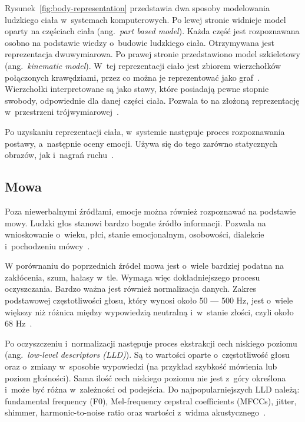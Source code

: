 Rysunek~\ref{fig:body-representation} przedstawia dwa sposoby modelowania ludzkiego ciała w~systemach komputerowych.
Po lewej stronie widnieje model oparty na częściach ciała (ang.~\textit{part based model}).
Każda część jest rozpoznawana osobno na podstawie wiedzy o~budowie ludzkiego ciała.
Otrzymywana jest reprezentacja dwuwymiarowa.
Po prawej stronie przedstawiono model szkieletowy (ang.~\textit{kinematic model}).
W~tej reprezentacji ciało jest zbiorem wierzchołków połączonych krawędziami, przez co można je reprezentować jako graf~\cite{Noroozi2021}.
Wierzchołki interpretowane są jako stawy, które posiadają pewne stopnie swobody, odpowiednie dla danej części ciała.
Pozwala to na złożoną reprezentację w~przestrzeni trójwymiarowej~\cite{Calvo2015}.

Po uzyskaniu reprezentacji ciała, w~systemie następuje proces rozpoznawania postawy, a~następnie oceny emocji.
Używa się do tego zarówno statycznych obrazów, jak i~nagrań ruchu~\cite{Noroozi2021, Kleinsmith2013}.


\subsection{Mowa}\label{subsec:mowa}

Poza niewerbalnymi źródłami, emocje można również rozpoznawać na podstawie mowy.
Ludzki głos stanowi bardzo bogate źródło informacji.
Pozwala na wnioskowanie o~wieku, płci, stanie emocjonalnym, osobowości, dialekcie i~pochodzeniu mówcy~\cite{Wani2021}.

W porównaniu do poprzednich źródeł mowa jest o~wiele bardziej podatna na zakłócenia, szum, hałasy w~tle.
Wymaga więc dokładniejszego procesu oczyszczania.
Bardzo ważna jest również normalizacja danych.
Zakres podstawowej częstotliwości głosu, który wynosi około 50 — 500 Hz, jest o~wiele większy niż różnica między wypowiedzią neutralną i~w~stanie złości, czyli około 68 Hz~\cite{Calvo2015}.

Po oczyszczeniu i~normalizacji następuje proces ekstrakcji cech niskiego poziomu (ang.~\textit{low-level descriptors (LLD)}).
Są to wartości oparte o~częstotliwość głosu oraz o~zmiany w~sposobie wypowiedzi (na przykład szybkość mówienia lub poziom głośności).
Sama ilość cech niskiego poziomu nie jest z~góry określona i~może być różna w~zależności od podejścia.
Do najpopularniejszych LLD należą: fundamental frequency (F0), Mel-frequency cepstral coefficients (MFCCs), jitter, shimmer, harmonic-to-noise ratio oraz wartości z~widma akustycznego~\cite{Calvo2015, Abdelwahab2014}.

